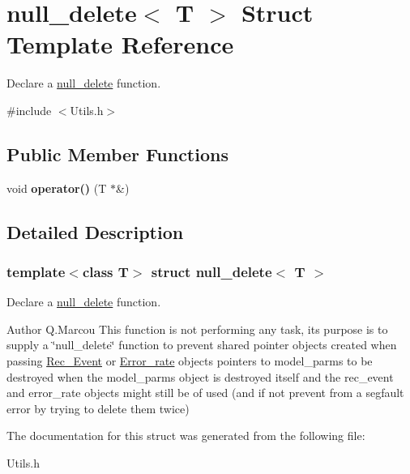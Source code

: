 \hypertarget{structnull__delete}{}\section{null\+\_\+delete$<$ T $>$ Struct Template Reference}
\label{structnull__delete}


Declare a \hyperlink{structnull__delete}{null\+\_\+delete} function.  




{\ttfamily \#include $<$Utils.\+h$>$}

\subsection*{Public Member Functions}
\begin{DoxyCompactItemize}
\item 
\mbox{\label{structnull__delete_aa8e9a2cfdcb8be0a53922e862d1d41b2}} 
void {\bfseries operator()} (T $\ast$\&)
\end{DoxyCompactItemize}


\subsection{Detailed Description}
\subsubsection*{template$<$class T$>$\newline
struct null\+\_\+delete$<$ T $>$}

Declare a \hyperlink{structnull__delete}{null\+\_\+delete} function. 

\begin{DoxyAuthor}{Author}
Q.\+Marcou This function is not performing any task, it\textquotesingle{}s purpose is to supply a \char`\"{}null\+\_\+delete\char`\"{} function to prevent shared pointer objects created when passing \hyperlink{classRec__Event}{Rec\+\_\+\+Event} or \hyperlink{classError__rate}{Error\+\_\+rate} objects pointers to model\+\_\+parms to be destroyed when the model\+\_\+parms object is destroyed itself and the rec\+\_\+event and error\+\_\+rate objects might still be of used (and if not prevent from a segfault error by trying to delete them twice) 
\end{DoxyAuthor}


The documentation for this struct was generated from the following file\+:\begin{DoxyCompactItemize}
\item 
Utils.\+h\end{DoxyCompactItemize}
